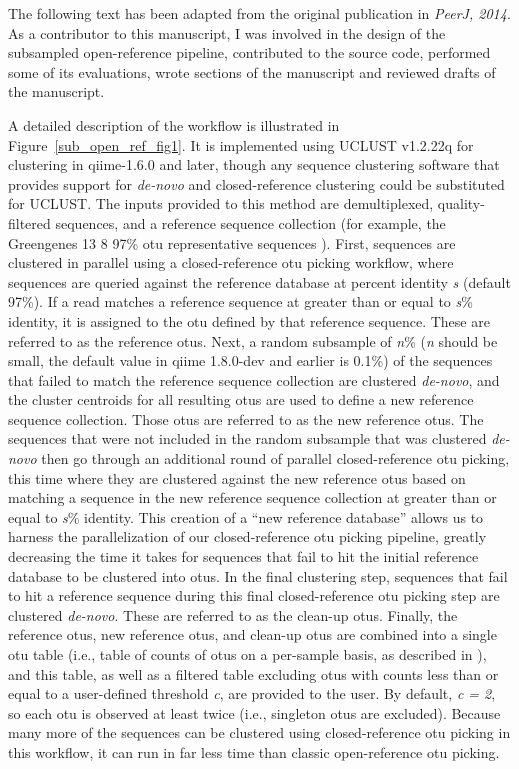 The following text has been adapted from the original publication in
\textsl{PeerJ, 2014}. As a contributor to this manuscript, I was involved in the
design of the subsampled open-reference pipeline, contributed
to the source code, performed some of its evaluations, wrote sections of the
manuscript and reviewed drafts of the manuscript.

A detailed description of the workflow is illustrated in Figure~\ref{sub_open_ref_fig1}.
It is implemented using UCLUST v1.2.22q \cite{Edgar2010} for clustering in \gls{qiime}-1.6.0 \cite{Caporaso2010}
and later, though any sequence clustering software that provides support for \emph{de-novo}
and closed-reference clustering could be substituted for UCLUST. The inputs
provided to this method are demultiplexed,
quality-filtered sequences, and a reference sequence collection (for example,
the Greengenes 13 8 97\% \gls{otu} representative sequences \cite{DeSantis2006, McDonald2012}).
First, sequences are clustered in parallel using a closed-reference \gls{otu} picking
workflow, where sequences are queried against the reference database at percent
identity \emph{s} (default 97\%). If a read matches a reference sequence at greater
than or equal to \emph{s}\% identity, it is assigned to the \gls{otu} defined by that
reference sequence. These are referred to as the reference \gls{otu}s. Next, a
random subsample of \emph{n}\% (\emph{n} should be small, the default value in
\gls{qiime} 1.8.0-dev and earlier is 0.1\%) of the sequences that failed to match
the reference sequence collection are clustered \emph{de-novo}, and the cluster
centroids for all resulting \gls{otu}s are used to define a new reference sequence
collection. Those \gls{otu}s are referred to as the new reference \gls{otu}s.
The sequences that were not included in the random subsample that was clustered
\emph{de-novo} then go through an additional round of parallel closed-reference \gls{otu}
picking, this time where they are clustered against the new reference \gls{otu}s based
on matching a sequence in the new reference sequence collection at greater than
or equal to \emph{s}\% identity. This creation of a “new reference database”
allows us to harness the parallelization of our closed-reference \gls{otu} picking
pipeline, greatly decreasing the time it takes for sequences that fail to hit the
initial reference database to be clustered into \gls{otu}s. In the final clustering
step, sequences that fail to hit a reference sequence during this final
closed-reference \gls{otu} picking step are clustered \emph{de-novo}. These are
referred to as the clean-up \gls{otu}s. Finally, the reference \gls{otu}s, new
reference \gls{otu}s, and clean-up \gls{otu}s are combined into a single \gls{otu}
table (i.e., table of counts of \gls{otu}s on a per-sample basis, as described in
\cite{McDonald2012BIOM}), and this table, as well as a filtered table excluding
\gls{otu}s with counts less than or equal to a user-defined threshold \emph{c},
are provided to the user. By default, \emph{c = 2}, so each \gls{otu} is
observed at least twice (i.e., singleton \gls{otu}s are excluded). Because
many more of the sequences can be clustered using closed-reference \gls{otu}
picking in this workflow, it can run in far less time than classic
open-reference \gls{otu} picking.

